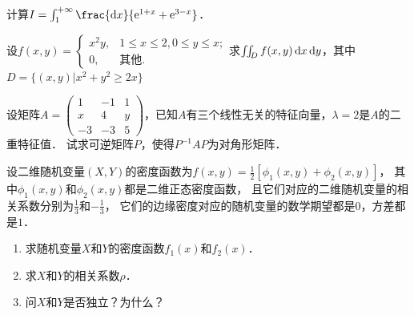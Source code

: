 \documentclass[plain,noanswer,medmath]{../../template/jnuexam}
\begin{document}

\begin{problem}
计算$I = \int_1^{+\infty} \frac{\dx}{\e^{1 + x} + \e^{3 - x}}$．
\end{problem}









\begin{problem}
设$f(x,y) = \begin{cases}
  x^2 y, & 1 \le x \le 2,0 \le y \le x; \\
      0, & \text{其他}.
\end{cases}$求$\iint_D f(x,y)\mathop{}\!\mathrm{d} x\mathop{}\!\mathrm{d} y$，其中$D = \{(x,y)|x^2 + y^2 \ge 2x\}$
\end{problem}









\begin{problem}
设矩阵$A = \begin{pmatrix}
   1 & -1 & 1 \\
   x &  4 & y \\
  -3 & -3 & 5
\end{pmatrix}$，已知$A$有三个线性无关的特征向量，$\lambda = 2$是$A$的二重特征值．
试求可逆矩阵$P$，使得$P^{-1} AP$为对角形矩阵．
\end{problem}



\begin{problem}
设二维随机变量$(X,Y)$的密度函数为$f(x,y) = \frac{1}{2}\left[\phi_1(x,y) + \phi_2(x,y) \right]$，
其中$\phi_1(x,y)$和$\phi_2(x,y)$都是二维正态密度函数，
且它们对应的二维随机变量的相关系数分别为$\frac{1}{3}$和$- \frac{1}{3}$，
它们的边缘密度对应的随机变量的数学期望都是$0$，方差都是$1$．
\begin{enumerate}
\item 求随机变量$X$和$Y$的密度函数$f_1(x)$和$f_2(x)$．
\item 求$X$和$Y$的相关系数$\rho$．
\item 问$X$和$Y$是否独立？为什么？
\end{enumerate}
\end{problem}



\end{document}
